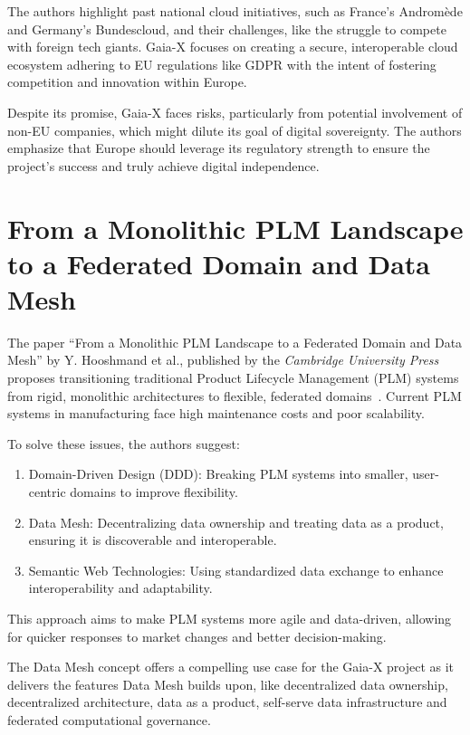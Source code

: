 The authors highlight past national cloud initiatives, such as France’s Andromède and Germany’s Bundescloud, and their challenges, like the struggle to compete with foreign tech giants.
Gaia-X focuses on creating a secure, interoperable cloud ecosystem adhering to EU regulations like GDPR with the intent of fostering competition and innovation within Europe.

Despite its promise, Gaia-X faces risks, particularly from potential involvement of non-EU companies, which might dilute its goal of digital sovereignty.
The authors emphasize that Europe should leverage its regulatory strength to ensure the project's success and truly achieve digital independence.

\section{From a Monolithic PLM Landscape to a Federated Domain and Data Mesh}\label{sec:from-a-monolithic-plm-landscape-to-a-federated-domain-and-data-mesh}

The paper ``From a Monolithic PLM Landscape to a Federated Domain and Data Mesh'' by Y. Hooshmand et al., published by the \textit{Cambridge University Press} proposes transitioning traditional Product Lifecycle Management (PLM) systems from rigid, monolithic architectures to flexible, federated domains~\cite{from_monolithic_plm_to_federated}.
Current PLM systems in manufacturing face high maintenance costs and poor scalability.

To solve these issues, the authors suggest:

\begin{enumerate}
\item Domain-Driven Design (DDD): Breaking PLM systems into smaller, user-centric domains to improve flexibility.
\item Data Mesh: Decentralizing data ownership and treating data as a product, ensuring it is discoverable and interoperable.
\item Semantic Web Technologies: Using standardized data exchange to enhance interoperability and adaptability.
\end{enumerate}
This approach aims to make PLM systems more agile and data-driven, allowing for quicker responses to market changes and better decision-making.

The Data Mesh concept offers a compelling use case for the Gaia-X project as it delivers the features Data Mesh builds upon, like decentralized data ownership, decentralized architecture, data as a product, self-serve data infrastructure and federated computational governance.

